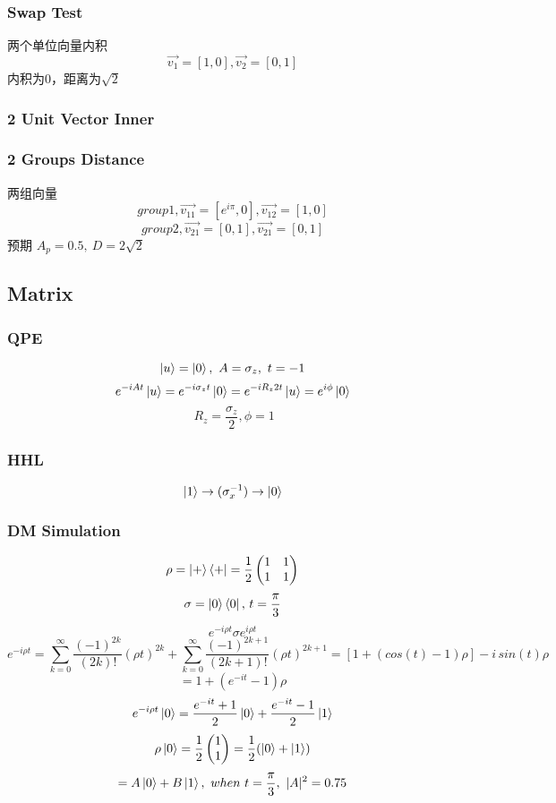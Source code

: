 \documentclass{article}
\begin{document}
\subsubsection{Swap Test}
	两个单位向量内积
	$$\vec{v_1} = [1,0], \vec{v_2} = [0,1] $$
	内积为0，距离为$\sqrt{2}$
\subsubsection{2 Unit Vector Inner}
\subsubsection{2 Groups Distance}
	两组向量
	$$ group 1 , \vec{v_{11}} =[e^{i\pi},0], \vec{v_{12}} =[1,0] $$
	$$ group 2 , \vec{v_{21}} =[0,1], \vec{v_{21}} =[0,1] $$
	预期 $ A_p = 0.5, \ D = 2\sqrt{2} $
\subsection{Matrix}
\subsubsection{QPE}
	$$ \ket{u} = \ket{0}, \  A=\sigma_z, \ t= -1 $$
	$$ e^{-iAt} \ket{u} = e^{-i \sigma_z t} \ket{0} = e^{-iR_z 2t} \ket{u} = e^{i \phi} \ket{0}$$
	$$ \ R_z = \frac{\sigma_z}{2}, \phi =1 $$
\subsubsection{HHL}
	$$ \ket{1} \rightarrow(\sigma_x^{-1}) \rightarrow \ket{0} $$
\subsubsection{DM Simulation}
	$$ \rho = \ket{+} \bra{+}  = \frac{1}{2} \left( \begin{matrix}
	1 & 1 \\
	1 & 1\\
\end{matrix} \right)	 $$
	$$ \sigma = \ket{0}\bra{0}, \, t=\frac{\pi}{3} $$
	$$ e^{-i \rho t} \sigma e^{i \rho t} $$
	$$ e^{-i \rho t} = \sum_{k=0}^{\infty} { \frac{(-1)^{2k}}{(2k)!} (\rho t) ^{2k} } +\sum_{k=0}^{\infty} { \frac{(-1)^{2k+1}}{(2k+1)!} (\rho t) ^{2k+1} } = [1+ (cos(t)-1)\rho]  - i\,sin(t) \rho $$
$$= 1+(e^{-it}-1)\rho$$
	$$ e^{-i \rho t} \ket{0} = \frac{e^{-it}+1}{2}\ket{0} + \frac{e^{-it}-1}{2}\ket{1} $$ $$ \rho \ket{0} = \frac{1}{2} \begin{pmatrix}
	1 \\ 1
	\end{pmatrix} = \frac{1}{2} (\ket{0} +\ket{1}) $$
	$$ =A\ket{0}+B\ket{1}, \ when \ t=\frac{\pi}{3}, \ |A|^2 =0.75 $$
\end{document}
